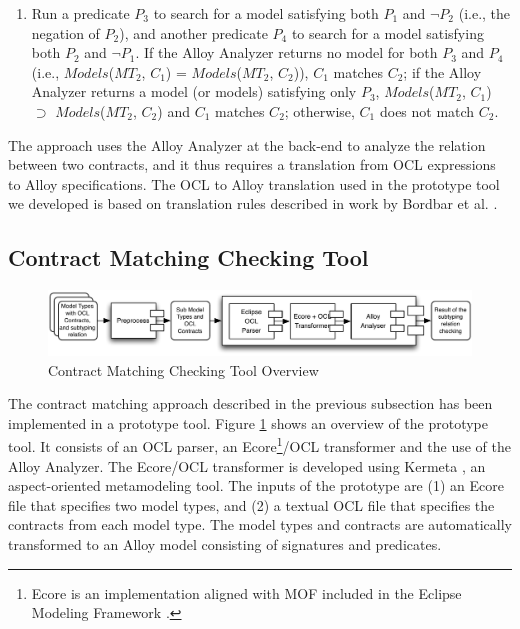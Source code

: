 \begin{enumerate}
\item Run a predicate $P_3$ to search for a model satisfying both $P_1$ and $\neg{P_2}$ (i.e., the negation of $P_2$), and another predicate $P_4$ to search for a model satisfying both $P_2$ and $\neg{P_1}$. 
If the Alloy Analyzer returns no model for both $P_3$ and $P_4$ (i.e., $Models$($MT_2$, $C_1$) = $Models$($MT_2$, $C_2$)), $C_1$ matches $C_2$; if the Alloy Analyzer returns a model (or models) satisfying only $P_3$, $Models$($MT_2$, $C_1$) $\supset$ $Models$($MT_2$, $C_2$) and $C_1$ matches $C_2$; 
otherwise, $C_1$ does not match $C_2$.
\end{enumerate}

The approach uses the Alloy Analyzer at the back-end to analyze the relation between two contracts, and it thus requires a translation from OCL expressions to Alloy specifications.
The OCL to Alloy translation used in the prototype tool we developed is based on translation rules described in work by Bordbar et al. \cite{anastasakis2010challenges}. 

\subsection{Contract Matching Checking Tool}\label{toolsupport}

\begin{figure}[!t]
\hspace{-5ex}
\includegraphics[width=5.3in]{fig/ToolSupport.pdf}
\caption{Contract Matching Checking Tool Overview}
\label{fig:toolsupport}
\end{figure}

The contract matching approach described in the previous subsection has been implemented in a prototype tool.
Figure \ref{fig:toolsupport} shows an overview of the prototype tool.
It consists of an OCL parser, an Ecore\footnote{Ecore is an implementation aligned with MOF included in the Eclipse Modeling Framework \cite{steinberg2008emf}.}/OCL transformer and the use of the Alloy Analyzer.
The Ecore/OCL transformer is developed using Kermeta \cite{muller2005weaving}, an aspect-oriented metamodeling tool. 
The inputs of the prototype are (1) an Ecore file that specifies two model types, and (2) a textual OCL file that specifies the contracts from each model type. 
The model types and contracts are automatically transformed to an Alloy model consisting of signatures and predicates.

